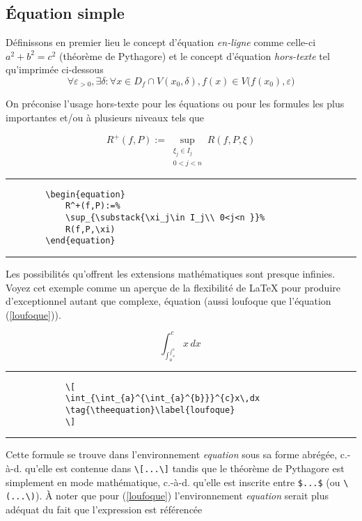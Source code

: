 	\subsection*{Équation simple}
	Définissons en premier lieu le concept d'équation \textit{en-ligne} comme celle-ci $a^2+b^2=c^2$ (théorème de Pythagore) et le concept d'équation  \textit{hors-texte}  tel qu'imprimée ci-dessous 
	\[
	\forall\varepsilon_{>0},\exists\delta : \forall x \in D_f \cap V(x_0,\delta), f(x)\in V\big(f(x_0),\varepsilon\big)
	\]
	\par On préconise l'usage hors-texte pour les équations ou pour les formules les plus importantes et/ou à plusieurs niveaux tels que
%
	\begin{table}[H]
		\centering
		\begin{equation}
		R^+(f,P):=\sup_{\substack{\xi_j\in I_j \\
				0<j<n }}
		R(f,P,\xi)\label{darboux}
		\end{equation}	
		\hrule
		\begin{verbatim}
		\begin{equation}
		    R^+(f,P):=%
		    \sup_{\substack{\xi_j\in I_j\\ 0<j<n }}%
		    R(f,P,\xi)
		\end{equation}
		\end{verbatim}
		\hrule
	\end{table}
%
	\par Les possibilités qu'offrent les extensions mathématiques sont presque infinies. Voyez cet exemple comme un aperçue de la flexibilité de \LaTeX{} pour produire d'exceptionnel autant que complexe, équation (aussi loufoque que l'équation (\ref{loufoque})).
%
	\begin{table}[H]
		\setcounter{equation}{2}
		\centering
		\[
		\int_{\int_{a}^{\int_{a}^{b}}}^{c}x\,dx\, 
		\tag{\theequation}\label{loufoque}
		\]
		\hrule
		\begin{verbatim}
			\[
			\int_{\int_{a}^{\int_{a}^{b}}}^{c}x\,dx
			\tag{\theequation}\label{loufoque}
			\]
		\end{verbatim}
		\hrule
	\end{table}
%
	\par Cette formule se trouve dans l'environnement \textit{equation} sous sa forme abrégée, c.-à-d. qu'elle est contenue dans \verb|\[...\]| tandis que le théorème de Pythagore est simplement en mode mathématique, c.-à-d. qu'elle est inscrite entre  \verb|$...$| (ou \verb|\(...\)|). À noter que pour (\ref{loufoque}) l'environnement \textit{equation} serait plus adéquat du fait que l'expression est référencée%
